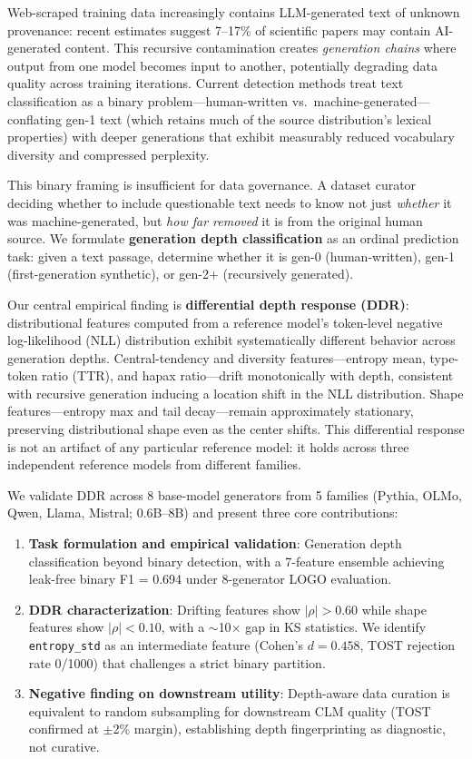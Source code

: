 \documentclass[11pt,a4paper]{article}
\begin{document}
Web-scraped training data increasingly contains LLM-generated text of unknown provenance: recent estimates suggest 7--17\% of scientific papers may contain AI-generated content.
This recursive contamination creates \emph{generation chains} where output from one model becomes input to another, potentially degrading data quality across training iterations.
Current detection methods treat text classification as a binary problem---human-written vs.\ machine-generated---conflating gen-1 text (which retains much of the source distribution's lexical properties) with deeper generations that exhibit measurably reduced vocabulary diversity and compressed perplexity.

This binary framing is insufficient for data governance.
A dataset curator deciding whether to include questionable text needs to know not just \emph{whether} it was machine-generated, but \emph{how far removed} it is from the original human source.
We formulate \textbf{generation depth classification} as an ordinal prediction task: given a text passage, determine whether it is gen-0 (human-written), gen-1 (first-generation synthetic), or gen-2+ (recursively generated).

Our central empirical finding is \textbf{differential depth response (DDR)}: distributional features computed from a reference model's token-level negative log-likelihood (NLL) distribution exhibit systematically different behavior across generation depths.
Central-tendency and diversity features---entropy mean, type-token ratio (TTR), and hapax ratio---drift monotonically with depth, consistent with recursive generation inducing a location shift in the NLL distribution.
Shape features---entropy max and tail decay---remain approximately stationary, preserving distributional shape even as the center shifts.
This differential response is not an artifact of any particular reference model: it holds across three independent reference models from different families.

We validate DDR across 8 base-model generators from 5 families (Pythia, OLMo, Qwen, Llama, Mistral; 0.6B--8B) and present three core contributions:

\begin{enumerate}
    \item \textbf{Task formulation and empirical validation}: Generation depth classification beyond binary detection, with a 7-feature ensemble achieving leak-free binary F1 = 0.694 under 8-generator LOGO evaluation.
    \item \textbf{DDR characterization}: Drifting features show $|\rho| > 0.60$ while shape features show $|\rho| < 0.10$, with a $\sim$10$\times$ gap in KS statistics. We identify \texttt{entropy\_std} as an intermediate feature (Cohen's $d = 0.458$, TOST rejection rate 0/1000) that challenges a strict binary partition.
    \item \textbf{Negative finding on downstream utility}: Depth-aware data curation is equivalent to random subsampling for downstream CLM quality (TOST confirmed at $\pm$2\% margin), establishing depth fingerprinting as diagnostic, not curative.
\end{enumerate}
\end{document}
